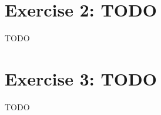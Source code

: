 \documentclass[
english,
smallborders
]{i6prcsht}
\begin{document}
\section*{Exercise 2: TODO}

TODO

\section*{Exercise 3: TODO}

TODO
\end{document}
